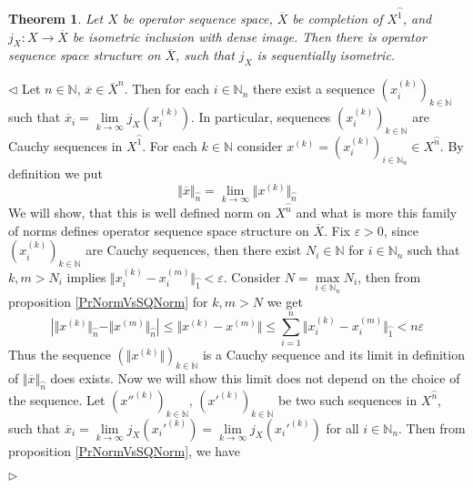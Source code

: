 \documentclass[12pt]{article}
\newtheorem{theorem}{Theorem}[subsection]
\newenvironment{proof}{\par $\triangleleft$}{$\triangleright$}
\begin{document}
\begin{theorem}\label{ThSQCompl}
Let $X$ be operator sequence space, $\overline{X}$ be completion of $X^{\wideparen{1}}$, and $j_X:X\to \overline{X}$ be isometric inclusion with dense image. Then there is operator sequence space structure on $\overline{X}$, such that $j_X$ is sequentially isometric.
\end{theorem}
\begin{proof} Let $n\in\mathbb{N}$, $\overline{x}\in \overline{X}^{n}$. Then for each $i\in\mathbb{N}_n$ there exist a sequence $(x_i^{(k)})_{k\in\mathbb{N}}$ such that $\overline{x}_i=\lim\limits_{k\to\infty}j_X(x_i^{(k)})$. 
In particular, sequences $(x_i^{(k)})_{k\in\mathbb{N}}$ are Cauchy sequences in $X^{\wideparen{1}}$. For each $k\in\mathbb{N}$ consider $x^{(k)}=(x_i^{(k)})_{i\in\mathbb{N}_n}\in X^{\wideparen{n}}$. By definition we put
$$
\Vert\overline{x}\Vert_{\wideparen{n}}=\lim\limits_{k\to\infty}\Vert x^{(k)}\Vert_{\wideparen{n}}
$$
We will show, that this is well defined norm on $X^{\wideparen{n}}$ and what is more this family of norms defines operator sequence space structure on $\overline{X}$. Fix $\varepsilon>0$, since $(x_i^{(k)})_{k\in\mathbb{N}}$ are Cauchy sequences, then there exist $N_i\in\mathbb{N}$ for $i\in\mathbb{N}_n$ such that $k,m>N_i$ implies 
$\Vert x_i^{(k)}-x_i^{(m)}\Vert_{\wideparen{1}}<\varepsilon$. Consider $N=\max\limits_{i\in\mathbb{N}_n}N_i$, then from proposition \ref{PrNormVsSQNorm} for $k,m>N$ we get
$$
\left|\Vert x^{(k)}\Vert_{\wideparen{n}}-\Vert x^{(m)}\Vert_{\wideparen{n}}\right|\leq\Vert x^{(k)}-x^{(m)}\Vert\leq\sum\limits_{i=1}^n\Vert x_i^{(k)}-x_i^{(m)}\Vert_{\wideparen{1}}<n\varepsilon
$$
Thus the sequence $(\Vert x^{(k)}\Vert)_{k\in\mathbb{N}}$ is a Cauchy sequence and its limit in definition of $\Vert \overline{x}\Vert_{\wideparen{n}}$ does exists. Now we will show this limit does not depend on the choice of the sequence.  
Let $(x''^{(k)})_{k\in\mathbb{N}}$, $(x'^{(k)})_{k\in\mathbb{N}}$ be two such sequences in $X^{\wideparen{n}}$, such that $\overline{x}_i=\lim\limits_{k\to\infty} j_X(x_i'^{(k)})=\lim\limits_{k\to\infty} j_X(x_i'^{(k)})$ for all $i\in\mathbb{N}_n$. Then from proposition \ref{PrNormVsSQNorm}, we have 


\end{proof}
\end{document}
